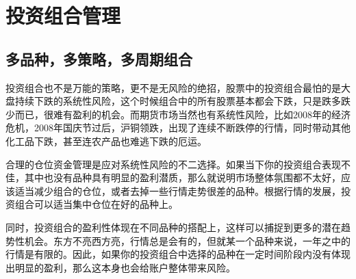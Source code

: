 \chapter{投资组合管理}
\section{多品种，多策略，多周期组合}
投资组合也不是万能的策略，更不是无风险的绝招，股票中的投资组合最怕的是大盘持续下跌的系统性风险，这个时候组合中的所有股票基本都会下跌，只是跌多跌少而已，很难有盈利的机会。而期货市场当然也有系统性风险，比如2008年的经济危机，2008年国庆节过后，沪铜领跌，出现了连续不断跌停的行情，同时带动其他化工品下跌，甚至连农产品也难逃下跌的厄运。

合理的仓位资金管理是应对系统性风险的不二选择。如果当下你的投资组合表现不佳，其中也没有品种具有明显的盈利潜质，那么就说明市场整体氛围都不太好，应该适当减少组合的仓位，或者去掉一些行情走势很差的品种。根据行情的发展，投资组合可以适当集中仓位在好的品种上。

同时，投资组合的盈利性体现在不同品种的搭配上，这样可以捕捉到更多的潜在趋势性机会。东方不亮西方亮，行情总是会有的，但就某一个品种来说，一年之中的行情是有限的。因此，如果你的投资组合中选择的品种在一定时间阶段内没有体现出明显的盈利，那么这本身也会给账户整体带来风险。